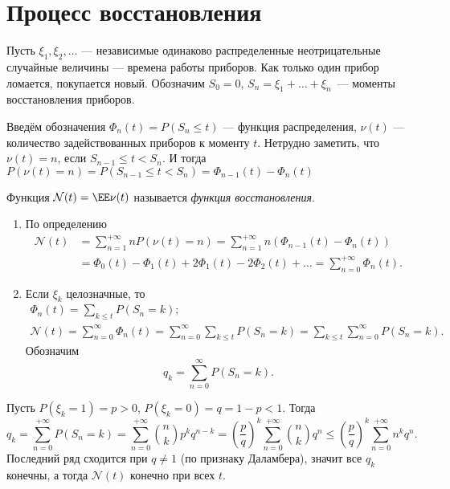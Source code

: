 \section{Процесс восстановления}
 \begin{definition}
 Пусть $\xi_1, \xi_2, \ldots$ --- независимые одинаково распределенные неотрицательные случайные величины --- времена работы приборов. Как только один прибор
 ломается, покупается новый. Обозначим $S_0 = 0$, $S_n = \xi_1 + \ldots + \xi_n$~--- моменты восстановления приборов.

Введём обозначения
 $\Phi_n(t) = P(S_n \le t)$ --- функция распределения, $\nu(t)$ --- количество задействованных приборов к моменту $t$.
 Нетрудно заметить, что $\nu(t) = n$, если $S_{n - 1}\le t < S_n$. И
 тогда $P(\nu(t) = n)  = P(S_{n - 1}\le t < S_n) = \Phi_{n - 1}(t) - \Phi_n(t)$
    
    Функция
     $\mathcal{N}(t) = \EE \nu(t)$ называется \textit{функция восстановления}.
 \end{definition}

 \begin{remark}
\enewline
     \begin{enumerate}
         \item По определению
         \begin{align*}
             \mathcal{N}(t) &= \sum\limits_{n=1} ^ {+\infty} nP(\nu(t) = n) = \sum\limits_{n=1} ^ {+\infty} n(\Phi_{n - 1}(t) - \Phi_n(t)) \\&=
                   \Phi_{0}(t) - \Phi_1(t) +2 \Phi_{1}(t) - 2\Phi_2(t) + \ldots = \sum\limits_{n=0} ^ {+\infty} \Phi_n(t).
         \end{align*}
        

         \item Если $\xi_k$ целозначные, то
         \begin{gather*}
             \Phi_n(t) = \sum\limits_{k \le t} P(S_n = k);\\
             \mathcal{N}(t) =\sum \limits_{n = 0}^{\infty} \Phi_n(t) = \sum \limits_{n = 0}^{\infty} \sum \limits_{k \le t} P(S_n = k) = 
               \sum \limits_{k \le t} \sum \limits_{n = 0}^{\infty}  P(S_n = k).
         \end{gather*}
         Обозначим
               $$q_k = \sum \limits_{n = 0}^{\infty}  P(S_n = k).$$
     \end{enumerate}
 \end{remark}

 \begin{example} Пусть
     $P(\xi_k = 1) = p>0$, $P(\xi_k = 0) =  q = 1-p < 1$. Тогда
     $$q_k = \sum\limits_{n=0} ^ {+\infty} P(S_n = k) = \sum\limits_{n=0} ^ {+\infty} \binom{n}{k} p^kq^{n - k} = \left(\frac{p}{q}\right)^k\sum\limits_{n=0} ^ {+\infty}
         \binom{n}{k}q^n \le \left(\frac{p}{q}\right)^k\sum\limits_{n=0} ^ {+\infty} n^kq^n.$$ Последний ряд сходится при $q \neq 1$
     (по признаку Даламбера), значит все $q_k$ конечны, а тогда $\mathcal{N}(t)$ конечно при всех $t$.
 \end{example}

